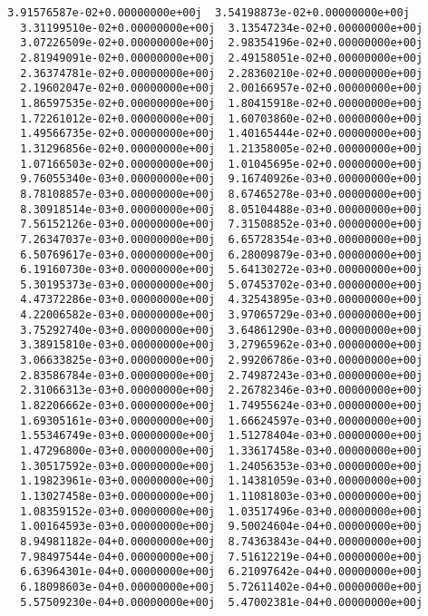 \documentclass[11pt]{article}
\begin{document}
\begin{Verbatim}[commandchars=\\\{\}]
  3.91576587e-02+0.00000000e+00j  3.54198873e-02+0.00000000e+00j
  3.31199510e-02+0.00000000e+00j  3.13547234e-02+0.00000000e+00j
  3.07226509e-02+0.00000000e+00j  2.98354196e-02+0.00000000e+00j
  2.81949091e-02+0.00000000e+00j  2.49158051e-02+0.00000000e+00j
  2.36374781e-02+0.00000000e+00j  2.28360210e-02+0.00000000e+00j
  2.19602047e-02+0.00000000e+00j  2.00166957e-02+0.00000000e+00j
  1.86597535e-02+0.00000000e+00j  1.80415918e-02+0.00000000e+00j
  1.72261012e-02+0.00000000e+00j  1.60703860e-02+0.00000000e+00j
  1.49566735e-02+0.00000000e+00j  1.40165444e-02+0.00000000e+00j
  1.31296856e-02+0.00000000e+00j  1.21358005e-02+0.00000000e+00j
  1.07166503e-02+0.00000000e+00j  1.01045695e-02+0.00000000e+00j
  9.76055340e-03+0.00000000e+00j  9.16740926e-03+0.00000000e+00j
  8.78108857e-03+0.00000000e+00j  8.67465278e-03+0.00000000e+00j
  8.30918514e-03+0.00000000e+00j  8.05104488e-03+0.00000000e+00j
  7.56152126e-03+0.00000000e+00j  7.31508852e-03+0.00000000e+00j
  7.26347037e-03+0.00000000e+00j  6.65728354e-03+0.00000000e+00j
  6.50769617e-03+0.00000000e+00j  6.28009879e-03+0.00000000e+00j
  6.19160730e-03+0.00000000e+00j  5.64130272e-03+0.00000000e+00j
  5.30195373e-03+0.00000000e+00j  5.07453702e-03+0.00000000e+00j
  4.47372286e-03+0.00000000e+00j  4.32543895e-03+0.00000000e+00j
  4.22006582e-03+0.00000000e+00j  3.97065729e-03+0.00000000e+00j
  3.75292740e-03+0.00000000e+00j  3.64861290e-03+0.00000000e+00j
  3.38915810e-03+0.00000000e+00j  3.27965962e-03+0.00000000e+00j
  3.06633825e-03+0.00000000e+00j  2.99206786e-03+0.00000000e+00j
  2.83586784e-03+0.00000000e+00j  2.74987243e-03+0.00000000e+00j
  2.31066313e-03+0.00000000e+00j  2.26782346e-03+0.00000000e+00j
  1.82206662e-03+0.00000000e+00j  1.74955624e-03+0.00000000e+00j
  1.69305161e-03+0.00000000e+00j  1.66624597e-03+0.00000000e+00j
  1.55346749e-03+0.00000000e+00j  1.51278404e-03+0.00000000e+00j
  1.47296800e-03+0.00000000e+00j  1.33617458e-03+0.00000000e+00j
  1.30517592e-03+0.00000000e+00j  1.24056353e-03+0.00000000e+00j
  1.19823961e-03+0.00000000e+00j  1.14381059e-03+0.00000000e+00j
  1.13027458e-03+0.00000000e+00j  1.11081803e-03+0.00000000e+00j
  1.08359152e-03+0.00000000e+00j  1.03517496e-03+0.00000000e+00j
  1.00164593e-03+0.00000000e+00j  9.50024604e-04+0.00000000e+00j
  8.94981182e-04+0.00000000e+00j  8.74363843e-04+0.00000000e+00j
  7.98497544e-04+0.00000000e+00j  7.51612219e-04+0.00000000e+00j
  6.63964301e-04+0.00000000e+00j  6.21097642e-04+0.00000000e+00j
  6.18098603e-04+0.00000000e+00j  5.72611402e-04+0.00000000e+00j
  5.57509230e-04+0.00000000e+00j  5.47002381e-04+0.00000000e+00j

\end{Verbatim}
\end{document}
